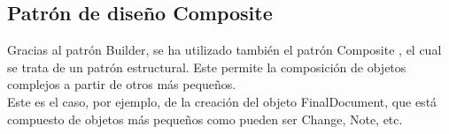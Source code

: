 \subsection{Patrón de diseño Composite}

Gracias al patrón Builder, se ha utilizado también el patrón Composite \cite{composite}, el cual se trata de un patrón estructural. Este permite la composición de objetos complejos a partir de otros más pequeños. 
\\

Este es el caso, por ejemplo, de la creación del objeto FinalDocument, que está compuesto de objetos más pequeños como pueden ser Change, Note, etc.